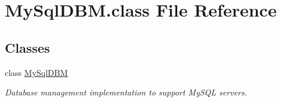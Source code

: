 \hypertarget{MySqlDBM_8class}{\section{My\-Sql\-D\-B\-M.\-class File Reference}
\label{MySqlDBM_8class}
}
\subsection*{Classes}
\begin{DoxyCompactItemize}
\item 
class \hyperlink{classMySqlDBM}{My\-Sql\-D\-B\-M}
\begin{DoxyCompactList}\small\item\em Database management implementation to support My\-S\-Q\-L servers. \end{DoxyCompactList}\end{DoxyCompactItemize}
